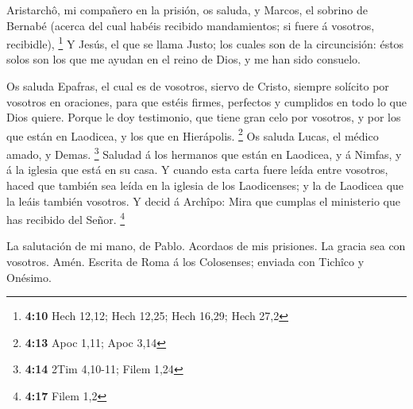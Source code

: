  Aristarchô, mi compañero en la prisión, os saluda, y
Marcos, el sobrino de Bernabé (acerca del cual habéis recibido
mandamientos; si fuere á vosotros, recibidle), \footnote{\textbf{4:10}
  Hech 12,12; Hech 12,25; Hech 16,29; Hech 27,2}  Y Jesús,
el que se llama Justo; los cuales son de la circuncisión: éstos solos
son los que me ayudan en el reino de Dios, y me han sido consuelo.

 Os saluda Epafras, el cual es de vosotros, siervo de
Cristo, siempre solícito por vosotros en oraciones, para que estéis
firmes, perfectos y cumplidos en todo lo que Dios quiere. 
Porque le doy testimonio, que tiene gran celo por vosotros, y por los
que están en Laodicea, y los que en Hierápolis. \footnote{\textbf{4:13}
  Apoc 1,11; Apoc 3,14}  Os saluda Lucas, el médico amado,
y Demas. \footnote{\textbf{4:14} 2Tim 4,10-11; Filem 1,24} 
Saludad á los hermanos que están en Laodicea, y á Nimfas, y á la iglesia
que está en su casa.  Y cuando esta carta fuere leída entre
vosotros, haced que también sea leída en la iglesia de los Laodicenses;
y la de Laodicea que la leáis también vosotros.  Y decid á
Archîpo: Mira que cumplas el ministerio que has recibido del Señor.
\footnote{\textbf{4:17} Filem 1,2}

 La salutación de mi mano, de Pablo. Acordaos de mis
prisiones. La gracia sea con vosotros. Amén. Escrita de Roma á los
Colosenses; enviada con Tichîco y Onésimo.
